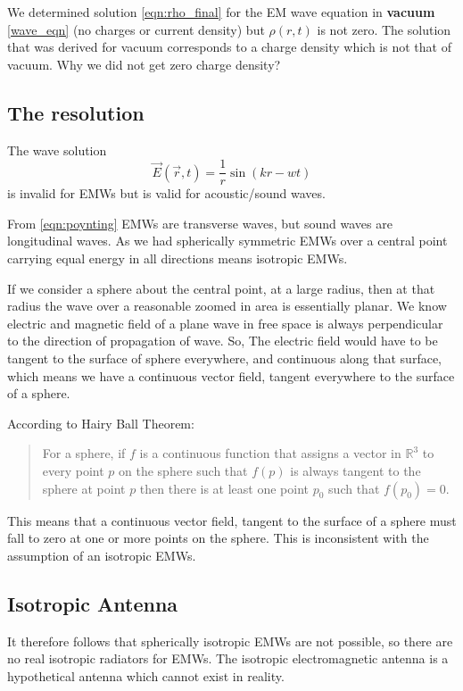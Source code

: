 We determined solution \eqref{eqn:rho_final} for the EM wave equation in \textbf{vacuum} \eqref{wave_eqn} (no charges or current density) but $\rho(r,t)$ is not zero. The solution that was derived for vacuum corresponds to a charge density which is not that of vacuum. Why we did not get zero charge density?

\subsection{The resolution}

The wave solution
%
   \begin{equation}
      \vec{E}(\vec{r},t) = \frac{1}{r}\sin(kr-wt)
   \end{equation}
%
is invalid for EMWs but is valid for acoustic/sound waves.

From \eqref{eqn:poynting} EMWs are transverse waves, but sound waves are longitudinal waves. As we had spherically symmetric EMWs over a central point carrying equal energy in all directions means isotropic EMWs.

If we consider a sphere about the central point, at a large radius, then at that radius the wave over a reasonable zoomed in area is essentially planar. We know electric and magnetic field of a plane wave in free space is always perpendicular to the direction of propagation of wave. So, The electric field would have to be tangent to the surface of sphere everywhere, and continuous along that surface, which means we have a continuous vector field, tangent everywhere to the surface of a sphere.

According to Hairy Ball Theorem:
%
\begin{quote}
   For a sphere, if $f$ is a continuous function that assigns a vector in $\mathbb{R}^3$ to every point $p$ on the sphere such that $f(p)$ is always tangent to the sphere at point $p$ then there is at least one point $p_0$ such that $f(p_0) = 0$.
\end{quote}

This means that a continuous vector field, tangent to the surface of a sphere must fall to zero at one or more points on the sphere. This is inconsistent with the assumption of an isotropic EMWs.

\subsection{Isotropic Antenna}

It therefore follows that spherically isotropic EMWs are not possible, so there are no real isotropic radiators for EMWs. The isotropic electromagnetic antenna is a hypothetical antenna which cannot exist in reality.


